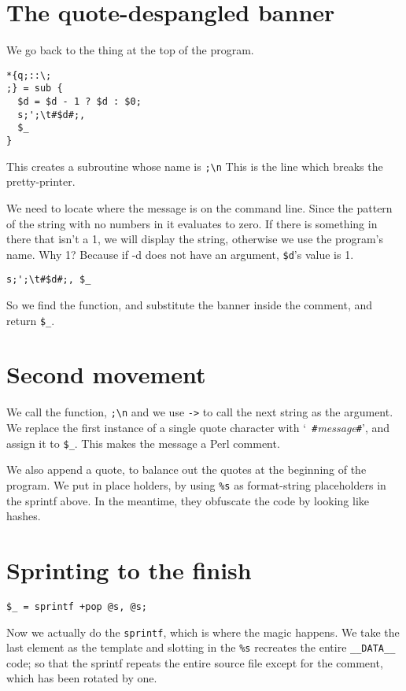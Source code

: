 \documentclass{article}
\begin{document}
\section{The quote-despangled banner}
We go back to the thing at the top of the program.
\begin{verbatim}
*{q;::\;
;} = sub { 
  $d = $d - 1 ? $d : $0; 
  s;';\t#$d#;, 
  $_ 
}
\end{verbatim}

This creates a subroutine whose name is \verb";\n"  This is the line
which breaks the pretty-printer.

We need to locate where the message is on the command line.  Since the
pattern of the string with no numbers in it evaluates to zero.  If there
is something in there that isn't a 1, we will display the string,
otherwise we use the program's name.  Why 1?  Because if -d does not
have an argument, \verb"$d"'s value is 1.

\begin{verbatim}
s;';\t#$d#;, $_
\end{verbatim}
So we find the function, and substitute the banner inside the comment,
and return \verb"$_".

\section{Second movement}
We call the function, \verb";\n" and we use \verb"->" to call the next
string as the
argument.  We replace the first instance of a single quote
character with `\texttt{ \#}\emph{message}\texttt{\#}', and assign it to
\verb"$_".  This makes the message a Perl comment.

We also append a quote, to balance out the quotes at the beginning
of the program.  We put in place holders, by using \verb"%s" as
format-string placeholders
in the sprintf above.  In the meantime, they obfuscate the code by
looking like hashes.

\section{Sprinting to the finish}
\begin{verbatim}
$_ = sprintf +pop @s, @s;
\end{verbatim}
Now we actually do the \verb"sprintf", which is where the magic happens.
We take the last element as the template and slotting in the \verb"%s" recreates
the entire \verb"__DATA__" code; so that the sprintf repeats the entire
source file except for the comment, which has been rotated by one.
\end{document}
